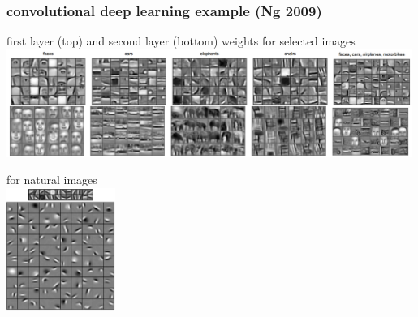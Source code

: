 \documentclass[USenglish,pdftex,compress,10pt,svgnamesi,handout]{beamer}
\begin{document}
\begin{frame}
\frametitle{convolutional deep learning example (Ng 2009)}
\begin{center}
first layer (top) and second layer (bottom) weights for selected images 
\includegraphics[width=0.99\textwidth]{pics/ng2009-1.png}

 for natural images \\
\includegraphics[height=4cm]{pics/ng2009-2.png}
\end{center}
\end{frame}
\end{document}
